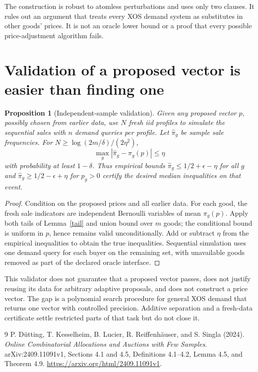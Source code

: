 \documentclass[11pt]{article}
\newtheorem{proposition}[theorem]{Proposition}
\theoremstyle{remark}
\begin{document}
The construction is robust to atomless perturbations and uses only two
clauses. It rules out an argument that treats every XOS demand system
as substitutes in other goods' prices. It is not an oracle lower bound
or a proof that every possible price-adjustment algorithm fails.

\section{Validation of a proposed vector is easier than finding one}
\begin{proposition}[Independent-sample validation]
Given any proposed vector $p$, possibly chosen from earlier data, use
$N$ fresh iid profiles to simulate the sequential sales with $n$ demand
queries per profile. Let $\widehat\pi_g$ be sample sale frequencies.
For $N\geq\log(2m/\delta)/(2\eta^2)$,
\[
 \max_g|\widehat\pi_g-\pi_g(p)|\leq\eta
\]
with probability at least $1-\delta$. Thus empirical bounds
$\widehat\pi_g\leq1/2+\epsilon-\eta$ for all $g$ and
$\widehat\pi_g\geq1/2-\epsilon+\eta$ for $p_g>0$ certify the desired
median inequalities on that event.
\end{proposition}
\begin{proof}
Condition on the proposed prices and all earlier data. For each good,
the fresh sale indicators are independent Bernoulli variables of mean
$\pi_g(p)$. Apply both tails of Lemma~\ref{tail} and union bound over
$m$ goods; the conditional bound is uniform in $p$, hence remains valid
unconditionally. Add or subtract $\eta$ from the empirical inequalities
to obtain the true inequalities. Sequential simulation uses one demand
query for each buyer on the remaining set, with unavailable goods
removed as part of the declared oracle interface.
\end{proof}

This validator does not guarantee that a proposed vector passes, does
not justify reusing its data for arbitrary adaptive proposals, and
does not construct a price vector. The gap is a polynomial search
procedure for general XOS demand that returns one vector with controlled
precision. Additive separation and a fresh-data certificate settle
restricted parts of that task but do not close it.
\begin{thebibliography}{9}
 P. D\"utting, T. Kesselheim, B. Lucier,
R. Reiffenh\"auser, and S. Singla (2024).
\emph{Online Combinatorial Allocations and Auctions with Few Samples}.
arXiv:2409.11091v1, Sections 4.1 and 4.5,
Definitions 4.1--4.2, Lemma 4.5, and Theorem 4.9.
\url{https://arxiv.org/html/2409.11091v1}.
\end{thebibliography}
\end{document}

